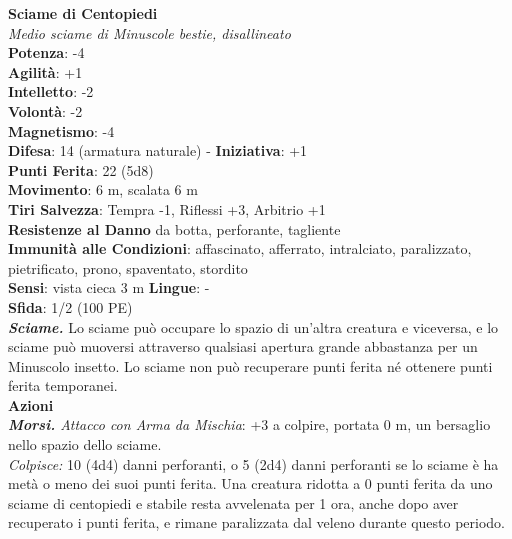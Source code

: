 \begin{multicols}{2}
\medskip\textbf{Sciame di Centopiedi}\\
\emph{Medio sciame di Minuscole bestie, disallineato}\\
\textbf{Potenza}: -4\\
\textbf{Agilità}: +1\\
\textbf{Intelletto}: -2\\
\textbf{Volontà}: -2\\
\textbf{Magnetismo}: -4\\
\textbf{Difesa}: 14 (armatura naturale) - \textbf{Iniziativa}: +1\\
\textbf{Punti Ferita}: 22 (5d8)\\
\textbf{Movimento}: 6 m, scalata 6 m\\
\textbf{Tiri Salvezza}: Tempra -1, Riflessi +3, Arbitrio +1\\
\textbf{Resistenze al Danno} da botta, perforante, tagliente\\
\textbf{Immunità alle Condizioni}: affascinato, afferrato, intralciato, paralizzato, pietrificato, prono, spaventato, stordito\\
\textbf{Sensi}: vista cieca 3 m
\textbf{Lingue}: -\\
\textbf{Sfida}: 1/2 (100 PE)\smallskip\\
\emph{\textbf{Sciame.}} Lo sciame può occupare lo spazio di un'altra creatura e viceversa, e lo sciame può muoversi attraverso qualsiasi apertura grande abbastanza per un Minuscolo insetto. Lo sciame non può recuperare punti ferita né ottenere punti ferita temporanei.\\
\smallskip\textbf{Azioni}\\
\emph{\textbf{Morsi.} Attacco con Arma da Mischia}: +3 a colpire, portata 0 m, un bersaglio nello spazio dello sciame.\\
\emph{Colpisce:} 10 (4d4) danni perforanti, o 5 (2d4) danni perforanti se lo sciame è ha metà o meno dei suoi punti ferita. Una creatura ridotta a 0 punti ferita da uno sciame di centopiedi e stabile resta avvelenata per 1 ora, anche dopo aver recuperato i punti ferita, e rimane paralizzata dal veleno durante questo periodo.\\


\end{multicols}
